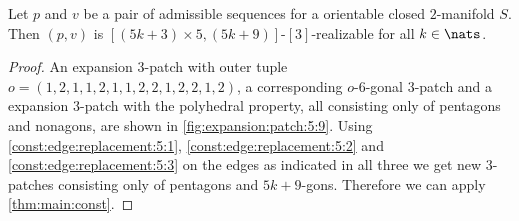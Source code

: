 \begin{theorem}
  Let $p$ and $v$ be a pair of admissible sequences for a orientable closed $2$-manifold $S$. Then $(p, v)$ is $[(5k + 3) \times 5, (5k+9)]$-$[3]$-realizable for all $k \in \nats$.
  \begin{proof}An expansion $3$-patch with outer tuple $o = (1, 2, 1, 1, 2, 1, 1, 2, 2, 1, 2, 2, 1, 2)$, a corresponding $o$-$6$-gonal $3$-patch and a expansion $3$-patch with the polyhedral property, all consisting only of pentagons and nonagons, are shown in \autoref{fig:expansion:patch:5:9}. Using \autoref{const:edge:replacement:5:1}, \autoref{const:edge:replacement:5:2} and \autoref{const:edge:replacement:5:3} on the edges as indicated in all three we get new $3$-patches consisting only of pentagons and $5k + 9$-gons. Therefore we can apply \autoref{thm:main:const}.
  \end{proof}
\end{theorem}
